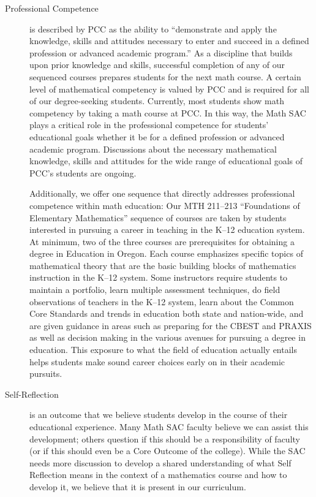 \begin{description}
	\item[Professional Competence] is described by PCC as the ability to
	      ``demonstrate and apply the knowledge, skills and attitudes necessary to enter
	      and succeed in a defined profession or advanced academic program.'' As a
	      discipline that builds upon prior knowledge and skills, successful completion
	      of any of our sequenced courses prepares students for the next math course.
	      A certain level of mathematical competency is valued by PCC and is required for all of our degree-seeking students.
	      Currently, most students show math competency by taking a math course at PCC.
	      In this way, the Math SAC plays a critical role in the professional competence for students' educational goals whether it be for a defined profession or advanced academic program.
	      Discussions about the necessary mathematical knowledge, skills and attitudes for the wide range of educational goals of PCC's students are ongoing.

	      Additionally, we offer one sequence that directly addresses professional competence within math education:  Our  MTH 211--213 ``Foundations of Elementary Mathematics'' sequence of courses are taken by students interested in pursuing a career in teaching in the K--12 education system.
	      At minimum, two of the three courses are prerequisites for obtaining a degree in Education in Oregon.
	      Each course emphasizes specific topics of mathematical theory that are the basic building blocks of mathematics instruction in the K--12 system.
	      Some instructors require students to maintain a portfolio, learn multiple assessment techniques, do field observations of teachers in the K--12 system, learn about the Common Core Standards and trends in education both state and nation-wide, and are given guidance in areas such as preparing for the CBEST and PRAXIS as well as decision making in the various avenues for pursuing a degree in education.
	      This exposure to what the field of education actually entails helps students make sound career choices early on in their academic pursuits.
	\item[Self-Reflection]
	      is an outcome that we believe students develop in the course of their
	      educational experience.
	      Many Math SAC faculty believe we can assist this development; others question if this should be a responsibility of faculty (or if this should even be a Core Outcome of the college).
	      While the SAC needs more discussion to develop a shared understanding of what Self Reflection means in the context of a mathematics course and how to develop it, we believe that it is present in our curriculum.


\end{description}
